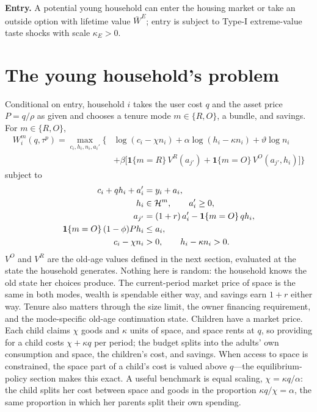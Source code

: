\documentclass[11pt]{article}
\newcommand{\1}{\mathbf 1}
\newcommand{\HH}{\mathcal H}
\begin{document}
\textbf{Entry.} A potential young household can enter the housing market or take an outside option with lifetime value $\bar W^E$; entry is subject to Type-I extreme-value taste shocks with scale $\kappa_E>0$.

\section{The young household's problem}

Conditional on entry, household $i$ takes the user cost $q$ and the asset price $P=q/\rho$ as given and chooses a tenure mode $m\in\{R,O\}$, a bundle, and savings. For $m\in\{R,O\}$,
\begin{equation}
\begin{aligned}
W_i^m(q,\tau^p)
=
\max_{c_i,h_i,n_i,a_i'}
\Big\{&
\log(c_i-\chi n_i)+\alpha\log(h_i-\kappa n_i)+\vartheta\log n_i\\
&+\beta\big[\1\{m=R\}\,V^R(a_{j'})+\1\{m=O\}\,V^O(a_{j'},h_i)\big]
\Big\}
\end{aligned}
\label{eq:compact_young_problem}
\end{equation}
subject to
\begin{align}
c_i+q h_i+a_i'&=y_i+a_i,
\label{eq:compact_young_budget}\\
h_i&\in\HH^m,
\qquad
a_i'\ge0,
\notag\\
a_{j'}&=(1+r)\,a_i'-\1\{m=O\}\,q h_i,
\label{eq:compact_perceived_transition}\\
\1\{m=O\}\,(1-\phi)P h_i&\le a_i,
\label{eq:compact_owner_dp}\\
c_i-\chi n_i&>0,
\qquad
h_i-\kappa n_i>0.
\notag
\end{align}
$V^O$ and $V^R$ are the old-age values defined in the next section, evaluated at the state the household generates. Nothing here is random: the household knows the old state her choices produce. The current-period market price of space is the same in both modes, wealth is spendable either way, and savings earn $1+r$ either way. Tenure also matters through the size limit, the owner financing requirement, and the mode-specific old-age continuation state. Children have a market price. Each child claims $\chi$ goods and $\kappa$ units of space, and space rents at $q$, so providing for a child costs $\chi+\kappa q$ per period; the budget splits into the adults' own consumption and space, the children's cost, and savings. When access to space is constrained, the space part of a child's cost is valued above $q$---the equilibrium-policy section makes this exact. A useful benchmark is equal scaling, $\chi=\kappa q/\alpha$: the child splits her cost between space and goods in the proportion $\kappa q/\chi=\alpha$, the same proportion in which her parents split their own spending.
\end{document}
